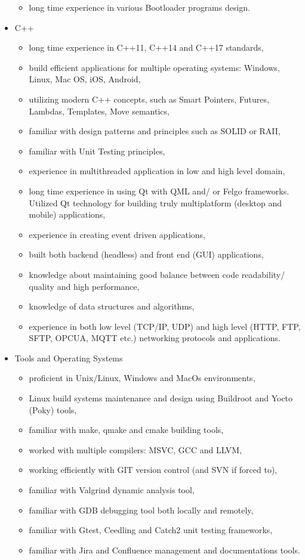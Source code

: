 \documentclass{tccv}
\begin{document}
\begin{itemize}
\begin{itemize}
			\item long time experience in various Bootloader programs design.
		\end{itemize}
	\item C++
		\begin{itemize}
			\item long time experience in C++11, C++14 and C++17 standards,
			\item build efficient applications for multiple operating systems: Windows, Linux, Mac OS, iOS, Android,
			\item utilizing modern C++ concepts, such as Smart Pointers, Futures, Lambdas, Templates, Move semantics,
			\item familiar with design patterns and principles such as SOLID or RAII,
			\item familiar with Unit Testing principles,
			\item experience in multithreaded application in low and high level domain,
			\item long time experience in using Qt with QML and/ or Felgo frameworks. Utilized Qt technology for building truly multiplatform (desktop and mobile) applications,
			\item experience in creating event driven applications,
			\item built both backend (headless) and front end (GUI) applications,
			\item knowledge about maintaining good balance between code readability/ quality and high performance,
			\item knowledge of data structures and algorithms,
			\item experience in both low level (TCP/IP, UDP) and high level (HTTP, FTP, SFTP, OPCUA, MQTT etc.) networking protocols and applications.
		\end{itemize}
	\item Tools and Operating Systems
		\begin{itemize}
			\item proficient in Unix/Linux, Windows and MacOs environments,
			\item Linux build systems maintenance and design using Buildroot and Yocto (Poky) tools,
			\item familiar with make, qmake and cmake building tools,
			\item worked with multiple compilers: MSVC, GCC and LLVM,
			\item working efficiently with GIT version control (and SVN if forced to),
			\item familiar with Valgrind dynamic analysis tool,
			\item familiar with GDB debugging tool both locally and remotely,		
			\item familiar with Gtest, Ceedling and Catch2 unit testing frameworks, 	
			\item familiar with Jira and Confluence management and documentations tools.		
			
		\end{itemize}
\end{itemize}
\end{document}
